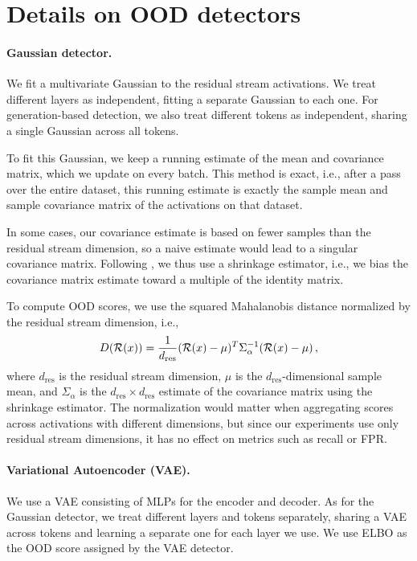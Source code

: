 \documentclass{article}
\begin{document}
\section{Details on OOD detectors}\label{sec:anomaly-detector-details}

\paragraph{Gaussian detector.}
We fit a multivariate Gaussian to the residual stream activations.
We treat different layers as independent, fitting a separate Gaussian to each one. For generation-based detection, we also treat different tokens as independent, sharing a single Gaussian across all tokens.

To fit this Gaussian, we keep a running estimate of the mean and covariance matrix, which we update on every batch. This method is exact, i.e., after a pass over the entire dataset, this running estimate is exactly the sample mean and sample covariance matrix of the activations on that dataset.

In some cases, our covariance estimate is based on fewer samples than the residual stream dimension, so a naive estimate would lead to a singular covariance matrix. Following \citet{talur2023few}, we thus use a shrinkage estimator, i.e., we bias the covariance matrix estimate toward a multiple of the identity matrix.

To compute OOD scores, we use the squared Mahalanobis distance normalized by the residual stream dimension, i.e.,
\begin{equation}
    D(\repr{x}) = \frac{1}{d_\text{res}}(\repr{x} - \mu)^T \Sigma_\alpha^{-1} (\repr{x} - \mu)\,,
\end{equation}
where $d_\text{res}$ is the residual stream dimension, $\mu$ is the $d_\text{res}$-dimensional sample mean, and $\Sigma_\alpha$ is the $d_\text{res} \times d_\text{res}$ estimate of the covariance matrix using the shrinkage estimator. The normalization would matter when aggregating scores across activations with different dimensions, but since our experiments use only residual stream dimensions, it has no effect on metrics such as recall or FPR.

\paragraph{Variational Autoencoder (VAE).}
We use a VAE consisting of MLPs for the encoder and decoder. As for the Gaussian detector, we treat different layers and tokens separately, sharing a VAE across tokens and learning a separate one for each layer we use. We use ELBO as the OOD score assigned by the VAE detector.
\end{document}
